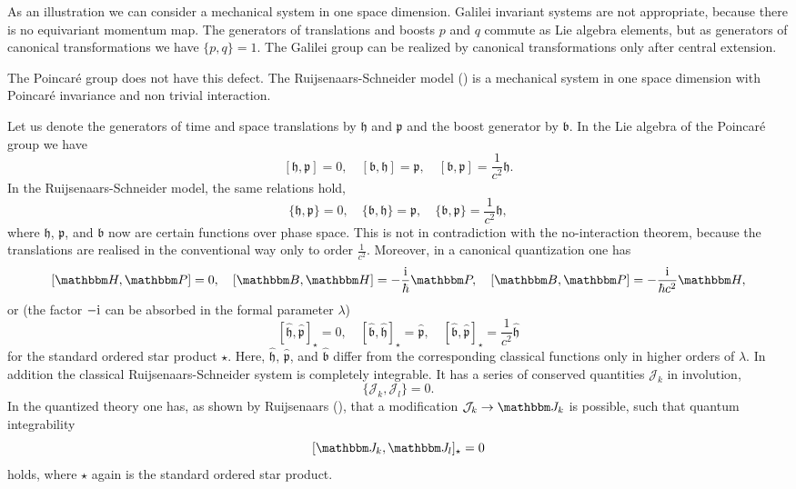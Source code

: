 \documentclass[a4paper,12pt]{article}
\begin{document}
As an illustration we can consider a mechanical system in one space
dimension. Galilei invariant systems are not appropriate, because there is no
equivariant momentum map. The generators of translations and boosts $p$ and $q$
commute
as Lie algebra elements, but as generators of canonical transformations we have
$\{p,q\}=1$. The Galilei group can be realized by canonical transformations only 
after central extension.

The Poincar\'e group does not have this defect. The Ruijsenaars-Schneider model
(\cite{RuijSch86})
is a mechanical system in one space dimension with Poincar\'e invariance and non 
trivial interaction.

Let us denote the generators of time and space translations by $\mathfrak h$ and 
$\mathfrak p$ and the boost generator by $\mathfrak b$. In the Lie algebra of
the Poincar\'e group we have 
\[
[\mathfrak h,\mathfrak p]=0,\quad [\mathfrak b,\mathfrak h]=\mathfrak p,\quad
[\mathfrak b,\mathfrak p]=\frac{1}{c^2}\mathfrak h.
\]
In the Ruijsenaars-Schneider model, 
the same relations hold,
\[
\{\mathfrak h,\mathfrak p\}=0,\quad \{\mathfrak b,\mathfrak h\}=\mathfrak p,\quad
\{\mathfrak b,\mathfrak p\}=\frac{1}{c^2}\mathfrak h,
\]
where $\mathfrak h$, $\mathfrak p$, and $\mathfrak b$ now are certain
functions over phase space. 
This is not in contradiction with the no-interaction theorem, because the
translations are realised in the conventional way only to order $\frac1{c^2}$.
Moreover, in a canonical quantization one has
\[
[\mathbbm H,\mathbbm P]=0,\quad 
[\mathbbm B,\mathbbm H]=-\frac{\textrm{i}}\hbar\mathbbm P, \quad
[\mathbbm B,\mathbbm P]=-\frac{\textrm{i}}{\hbar c^2}\mathbbm H,
\]
or 
(the factor $-\textrm i$ can be absorbed in the formal parameter $\lambda$)
\[
[\hat{\mathfrak h},\hat{\mathfrak p}]_\star=0,
\quad [\hat{\mathfrak b},\hat{\mathfrak h}]_\star=\hat{\mathfrak p},
\quad
[\hat{\mathfrak b},\hat{\mathfrak p}]_\star=\frac{1}{c^2}\hat{\mathfrak h}
\]
for the standard ordered star product $\star$.
Here, $\hat{\mathfrak h}$, $\hat{\mathfrak p}$, and $\hat{\mathfrak b}$ 
differ from the corresponding classical
functions only in higher orders of $\lambda$.
In addition the classical Ruijsenaars-Schneider system is completely
integrable. It has a series of conserved quantities $\mathcal J_k$ in
involution,
\[
\{\mathcal J_k,\mathcal J_l\}=0.
\]
In the quantized theory one has, as shown by Ruijsenaars (\cite{Ruij87}), 
that a modification
$\mathcal J_k\rightarrow\mathbbm J_k$ is possible, such that quantum integrability 
\[
[\mathbbm J_k,\mathbbm J_l]_\star=0
\]
holds, where $\star$ again is the standard ordered star product. 
\end{document}
